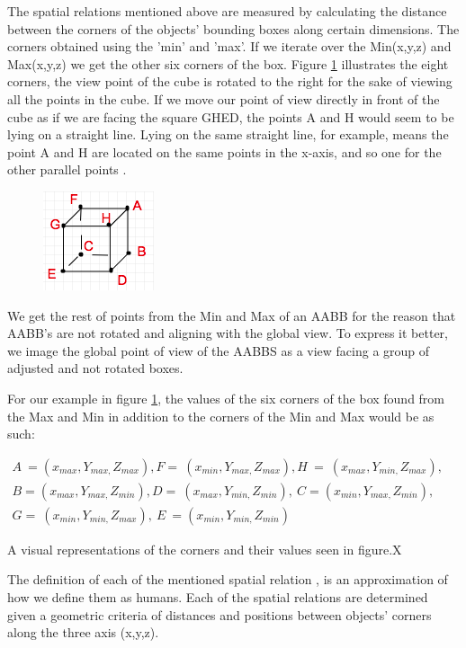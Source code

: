 The spatial relations mentioned above are measured by calculating the distance between the corners of the objects' bounding boxes along certain dimensions. The corners obtained using the 'min' and 'max'. If we iterate over the Min(x,y,z) and Max(x,y,z) we get the other six corners of the box. Figure \ref{fig:box_points} illustrates the eight corners, the view point of the cube is rotated to the right for the sake of viewing all the points in the cube. If we move our point of view directly in front of the cube as if  we are facing the square GHED,  the points A and H would seem to be lying on a straight line. Lying on the same straight line, for example, means the point A and H are located on the same points in the x-axis, and so one for the other parallel points .\begin{figure}[H]
\centering
\includegraphics{images/cornerPoints.png} %
\caption{}
\label{fig:box_points}
\end{figure} 

We get the rest of points from the Min and Max of an AABB for the reason that AABB's are not rotated and aligning with the global view. To express it better, we image the global point of view of the AABBS as a view facing a group of adjusted and not rotated boxes. 

For our example in figure \ref{fig:box_points}, the values of the six corners of the box found from the Max and Min in addition to the corners of the Min and Max would be as such: 

$\begin{array}{l}
A\ =( x_{max} ,Y_{max,} Z_{max}) ,F=\ ( x_{min} ,Y_{max,} Z_{max}) ,H\ =\ ( x_{max} ,Y_{min,} Z_{max}) ,\\
B=( x_{max} ,Y_{max,} Z_{min}) ,D=\ ( x_{max} ,Y_{min,} Z_{min}) ,\ C=( x_{min} ,Y_{max,} Z_{min}) ,\\
G=\ ( x_{min} ,Y_{min,} Z_{max}) ,\ E\ =( x_{min} ,Y_{min,} Z_{min})
\end{array}$

  


A visual representations of the corners and their values seen in figure.X 


The definition of each of the mentioned spatial relation , is an approximation of how we define them as humans. Each of the spatial relations are determined given a geometric criteria of distances and positions between objects' corners along the three axis  (x,y,z). 

